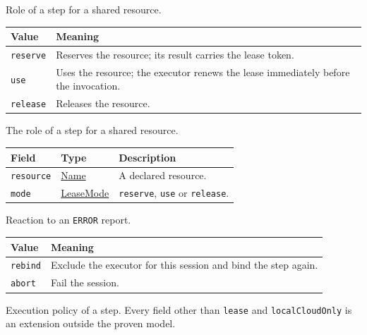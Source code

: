 \documentclass[a4paper]{arrowhead}
\newcommand{\mref}[1]{{\textcolor{ArrowheadPurple}{\hyperref[sec:model:#1]{#1}}}}
\newcommand{\pref}[1]{{\textcolor{ArrowheadGrey}{\hyperref[sec:model:primitives:#1]{#1}}}}
\begin{document}
Role of a step for a shared resource.

{\small
\begin{longtable}{|p{3.9cm}|p{11.9cm}|}

\hline
\rowcolor{gray!33} Value & Meaning \\ \hline
\endhead
\texttt{reserve} & Reserves the resource; its result carries the lease token. \\ \hline
\texttt{use} & Uses the resource; the executor renews the lease immediately before the invocation. \\ \hline
\texttt{release} & Releases the resource. \\ \hline
\end{longtable}
}

The role of a step for a shared resource.

{\small
\begin{longtable}{|p{3.9cm}|p{4.4cm}|p{7.5cm}|}

\hline
\rowcolor{gray!33} Field & Type & Description \\ \hline
\endhead
\texttt{resource} & \pref{Name} & A declared resource. \\ \hline
\texttt{mode} & \mref{LeaseMode} & \texttt{reserve}, \texttt{use} or \texttt{release}. \\ \hline
\end{longtable}
}

Reaction to an \texttt{ERROR} report.

{\small
\begin{longtable}{|p{3.9cm}|p{11.9cm}|}

\hline
\rowcolor{gray!33} Value & Meaning \\ \hline
\endhead
\texttt{rebind} & Exclude the executor for this session and bind the step again. \\ \hline
\texttt{abort} & Fail the session. \\ \hline
\end{longtable}
}

Execution policy of a step. Every field other than \texttt{lease} and \texttt{localCloudOnly} is an extension outside the proven model.
\end{document}
